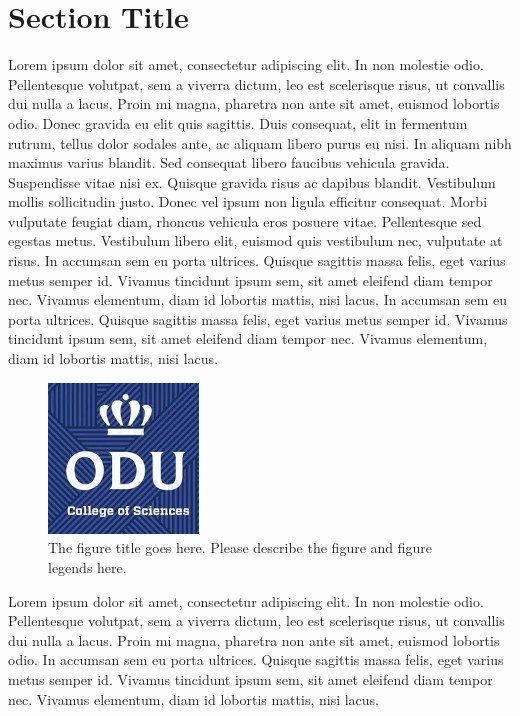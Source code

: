 \section{Section Title}
Lorem ipsum dolor sit amet, consectetur adipiscing elit. In non molestie odio. Pellentesque volutpat, sem a viverra dictum, leo est scelerisque risus, ut convallis dui nulla a lacus. Proin mi magna, pharetra non ante sit amet, euismod lobortis odio. Donec gravida eu elit quis sagittis. Duis consequat, elit in fermentum rutrum, tellus dolor sodales ante, ac aliquam libero purus eu nisi. In aliquam nibh maximus varius blandit. Sed consequat libero faucibus vehicula gravida. Suspendisse vitae nisi ex. Quisque gravida risus ac dapibus blandit. Vestibulum mollis sollicitudin justo. Donec vel ipsum non ligula efficitur consequat. Morbi vulputate feugiat diam, rhoncus vehicula eros posuere vitae. Pellentesque sed egestas metus. Vestibulum libero elit, euismod quis vestibulum nec, vulputate at risus. In accumsan sem eu porta ultrices. Quisque sagittis massa felis, eget varius metus semper id. Vivamus tincidunt ipsum sem, sit amet eleifend diam tempor nec. Vivamus elementum, diam id lobortis mattis, nisi lacus. In accumsan sem eu porta ultrices. Quisque sagittis massa felis, eget varius metus semper id. Vivamus tincidunt ipsum sem, sit amet eleifend diam tempor nec. Vivamus elementum, diam id lobortis mattis, nisi lacus.
\begin{figure}[tbh]
  \centering
  \includegraphics[height=4cm]{Figures/cos1.jpeg}
  \caption[The figure title goes here.]{The figure title goes here. Please describe the figure and figure legends here.}
  \label{fig:cos1_7}
\end{figure}


Lorem ipsum dolor sit amet, consectetur adipiscing elit. In non molestie odio. Pellentesque volutpat, sem a viverra dictum, leo est scelerisque risus, ut convallis dui nulla a lacus. Proin mi magna, pharetra non ante sit amet, euismod lobortis odio. In accumsan sem eu porta ultrices. Quisque sagittis massa felis, eget varius metus semper id. Vivamus tincidunt ipsum sem, sit amet eleifend diam tempor nec. Vivamus elementum, diam id lobortis mattis, nisi lacus.

